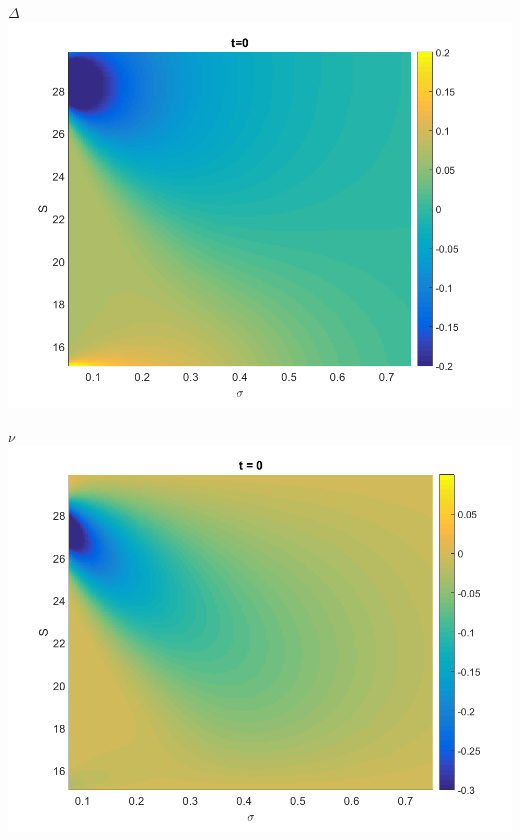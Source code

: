 \documentclass{beamer}
\numberwithin{equation}{section}
\begin{document}
\begin{frame}{$\Delta$}
\centering
\includegraphics[width=1\textwidth]{../plots/delta_sigma_field}
\end{frame}

\begin{frame}{$\nu$}
  \centering
  \includegraphics[width=1\textwidth]{../plots/vega_field_sigma}
\end{frame}

\begin{frame}

\end{frame}
\end{document}
